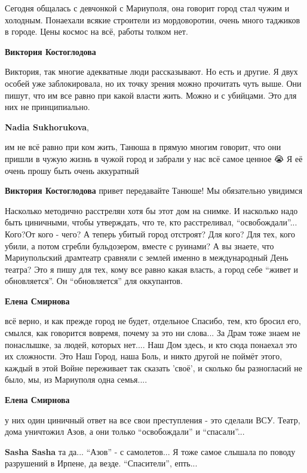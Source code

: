 Сегодня общалась с девчонкой с Мариуполя, она говорит город стал чужим и
холодным. Понаехали всякие строители из мордоворотии, очень много таджиков в
городе. Цены космос на всё, работы толком нет.

\begin{itemize} %
\textbf{Виктория Костоглодова} 

Виктория, так многие адекватные люди рассказывают. Но есть и другие. Я двух
особей уже заблокировала, но их точку зрения можно прочитать чуть выше. Они
пишут, что им все равно при какой власти жить. Можно и с убийцами. Это для них
не принципиально.

\textbf{Nadia Sukhorukova}, 

им не всё равно при ком жить, Танюша в прямую многим говорит, что они пришли в
чужую жизнь в чужой город и забрали у нас всё самое ценное 😭 Я её очень прошу
быть очень аккуратный

\textbf{Виктория Костоглодова} привет передавайте Танюше! Мы обязательно увидимся
\end{itemize} %


Насколько методично расстрелян хотя бы этот дом на снимке. И насколько надо
быть циничными, чтобы утверждать, что те, кто расстреливал, \enquote{освобождали}...
Кого?От кого - чего? А теперь убитый город отстроят? Для кого? Для тех, кого
убили, а потом сгребли бульдозером, вместе с руинами? А вы знаете, что
Мариупольский драмтеатр сравняли с землей именно в международный День театра?
Это я пишу для тех, кому все равно какая власть, а город себе \enquote{живет и
обновляется}. Он \enquote{обновляется} для оккупантов.

\begin{itemize} %
\textbf{Елена Смирнова} 

всё верно, и как прежде город не будет, отдельное Спасибо, тем, кто бросил его,
смылся, как говорится вовремя, почему за это ни слова... За Драм тоже знаем не
понаслышке, за людей, которых нет.... Наш Дом здесь, и кто сюда понаехал это их
сложности. Это Наш Город, наша Боль, и никто другой не поймёт этого, каждый в
этой Войне переживает так сказать 'своё', и сколько бы разногласий не было, мы,
из Мариуполя одна семья....

\textbf{Елена Смирнова} 

у них один циничный ответ на все свои преступления - это сделали ВСУ. Театр,
дома уничтожил Азов, а они только \enquote{освобождали} и \enquote{спасали}...

\textbf{Sasha Sasha} та да... \enquote{Азов} - с самолетов... Я тоже самое слышала по поводу разрушений в Ирпене, да везде. \enquote{Спасители}, епть...
\end{itemize} %

